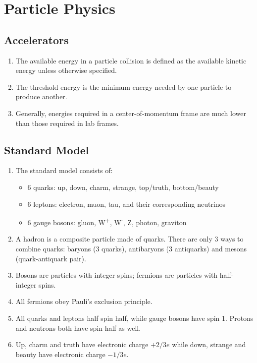 \chapter{Particle Physics}
\section{Accelerators}
\begin{enumerate}
    \item The available energy in a particle collision is defined as the available kinetic energy unless otherwise specified.
    \item The threshold energy is the minimum energy needed by one particle to produce another.
    \item Generally, energies required in a center-of-momentum frame are much lower than those required in lab frames.
\end{enumerate}
\section{Standard Model}
\begin{enumerate}
    \item The standard model consists of:
    \begin{itemize}
        \item 6 quarks: up, down, charm, strange, top/truth, bottom/beauty
        \item 6 leptons: electron, muon, tau, and their corresponding neutrinos
        \item 6 gauge bosons: gluon, W\textsuperscript{+}, W\textsuperscript{-}, Z, photon, graviton
    \end{itemize}
    \item A hadron is a composite particle made of quarks. There are only 3 ways to combine quarks: baryons (3 quarks), antibaryons (3 antiquarks) and mesons (quark-antiquark pair).
    \item Bosons are particles with integer spins; fermions are particles with half-integer spins.
    \item All fermions obey Pauli's exclusion principle.
    \item All quarks and leptons half spin half, while gauge bosons have spin 1. Protons and neutrons both have spin half as well.
    \item Up, charm and truth have electronic charge \(+2/3e\) while down, strange and beauty have electronic charge \(-1/3e\).
\end{enumerate}
